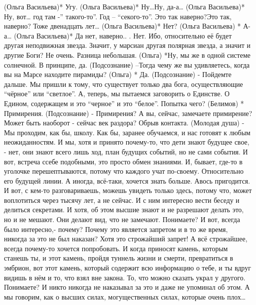 (Ольга Васильева)* Угу.
(Ольга Васильева)* Ну…Ну, да-а…
(Ольга Васильева)* Ну, вот… год там  -'' такого-то''. Год – ``секого-то''. Это так наверно?Это так, наверно?  Тоже двенадцать лет…
(Ольга Васильева)* Нет?
(Ольга Васильева) * А-а…
(Ольга Васильева)* Да нет, наверно..
. Нет. Ибо, относительно её  будет другая неподвижная звезда. Значит, у марсиан другая полярная звезда, а значит и другие Боги?  Не очень. Разница небольшая.
(Ольга) *Ну, мы же в одной системе солнечной. В принципе, да.
(Подсознание) –Тогда чему же вы удивляетесь, когда вы на Марсе находите пирамиды?
(Ольга) * Да.
(Подсознание) - Пойдемте дальше. Мы пришли к тому, что существует только два бога, осуществляющие ``чёрное'' или ``светлое''. А, теперь, мы пытаемся заговорить о Единстве. О Едином, содержащем и это ``черное'' и это ``белое''. Попытка чего?
(Белимов) * Примирения.
(Подсознание) - Примирения? А вы, сейчас, замечаете примирение? Может быть наоборот - сейчас век раздора?
Обрыв контакта.
(Молодая душа) - Мы проходим, как бы, школу. Как бы, заранее обучаемся, и нас готовят к любым неожиданностям. И мы, хотя и принято почему-то, что дети знают будущее свое, - нет, они знают всего лишь ход, план будущих событий, но не сами события. И вот, встреча ссебе подобными, это просто обмен знаниями. И, бывает, где-то в уголочке перешептываются, потому что каждого учат по-своему. Относительно его будущей линии. А иногда, всё-таки, хочется знать больше.  Авось пригодится. И вот, с кем-то разговариваешь, можешь увидеть только здесь, потому что, может воплотиться через тысячу лет, а не сейчас. И с ним интересно вести  беседу и делиться секретами. И хотя, об этом высшие знают и не разрешают делать это, но и не мешают. Они делают вид, что не замечают. Понимаете?  И вот,  всегда было интересно,- почему? Почему это является запретом и в то же время, никогда за это не был наказан? Хотя это строжайший запрет! А всё строжайшее, всегда почему-то хочется попробовать. И когда приносят камень, которым станешь ты, и этот камень, пройдя туннель жизни и смерти, превратиться в эмбрион, вот этот камень, который содержит всю информацию о тебе, и ты вдруг видишь в нём и то, что взял вне закона. То, что можно сказать  украл у другого. Понимаете? И никто никогда не наказывал за это и даже не упоминал об этом. А мы говорим, как о высших силах, могущественных силах, которые очень плох…

